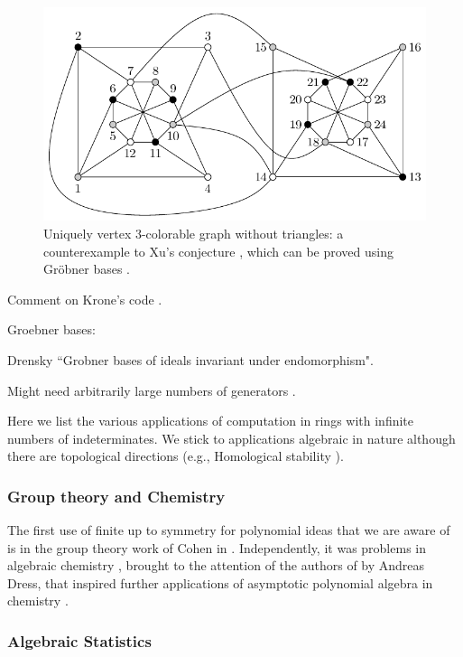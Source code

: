 \begin{figure}
\begin{center}
\includegraphics[width=.8 \linewidth]{akbarigraph.pdf}
\caption{Uniquely vertex 3-colorable graph without triangles: a counterexample \cite{akbari2001kr} to Xu's conjecture \cite{shaoji1990size}, which can be proved using Gr\"obner bases \cite{hillar2008algebraic}.}\label{graph}
\end{center}
\end{figure}

Comment on Krone's code \cite{EquivariantGB}.

Groebner bases:

Drensky ``Grobner bases of ideals invariant under endomorphism".


Might need arbitrarily large numbers of generators \cite{hillar2008minimal}.

Here we list the various applications of computation in rings with infinite numbers of indeterminates.  
We stick to applications algebraic in nature although there are topological directions (e.g., Homological stability \cite{randal2013homological, church2012homological}).


\subsubsection{Group theory and Chemistry}

The first use of finite up to symmetry for polynomial ideas that we are aware of is in the group theory work of Cohen in \cite{cohen1967laws}.  
Independently, it was problems in algebraic chemistry \cite{ruch1967vandermondesche}, brought to the attention of the authors of \cite{aschenbrenner2007finite} by Andreas Dress, that inspired further applications of asymptotic polynomial algebra in chemistry \cite{Draisma08b}.

\subsubsection{Algebraic Statistics}

